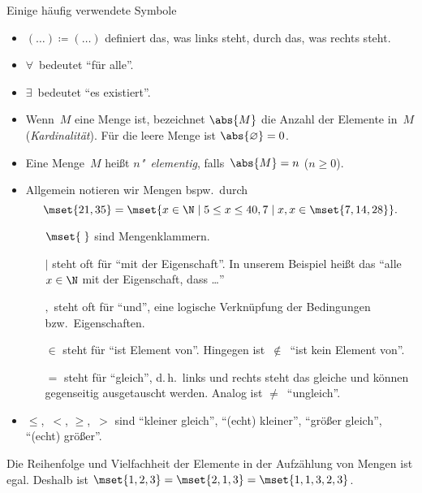 \documentclass[a4paper]{article}
\begin{document}
\begin{notation}
    Einige häufig verwendete Symbole
    \begin{itemize}
        \item $(\dots) \coloneqq (\dots)$ definiert das, was links steht, durch das, was rechts steht.
        \item $\forall$~bedeutet "`für alle"'.
        \item $\exists$~bedeutet "`es existiert"'.
        \item Wenn~$M$ eine Menge ist, bezeichnet $\abs{M}$ die Anzahl der Elemente in~$M$ (\emph{Kardinalität}). Für die leere Menge ist $\abs{\varnothing} = 0$.
        \item Eine Menge~$M$ heißt \emph{$n$"~elementig}, falls~$\abs{M} = n$ ($n \geq 0$).
        \item Allgemein notieren wir Mengen bspw.\ durch
              \begin{equation*}
                  \mset{21, 35} = \mset{x \in \N \mid 5 \leq x \leq 40, 7 \mid x, x \in \mset{7, 14, 28}}.
              \end{equation*}

              \begin{itemize}
                  \item[$\mset{\;}$] sind Mengenklammern.
                      \item[$\mid$]steht oft für "`mit der Eigenschaft"'. In unserem Beispiel heißt das "`alle $x \in \N$ mit der Eigenschaft, dass \dots"'
                  \item[$,$] steht oft für "`und"', eine logische Verknüpfung der Bedingungen bzw.\ Eigenschaften.
                  \item[$\in$] steht für "`ist Element von"'. Hingegen ist~$\notin$~"`ist kein Element von"'.
                  \item[$=$] steht für "`gleich"', d.\,h.\ links und rechts steht das gleiche und können gegenseitig ausgetauscht werden. Analog ist $\neq$~"`ungleich"'.
              \end{itemize}
        \item $\leq$,~$<$, $\geq$,~$>$ sind "`kleiner gleich"', "`(echt) kleiner"', "`größer gleich"', "`(echt) größer"'.
    \end{itemize}
\end{notation}

\begin{remark}
    Die Reihenfolge und Vielfachheit der Elemente in der Aufzählung von Mengen ist egal. Deshalb ist $\mset{1, 2, 3} = \mset{2, 1, 3} = \mset{1, 1, 3, 2, 3}$.
\end{remark}
\end{document}
